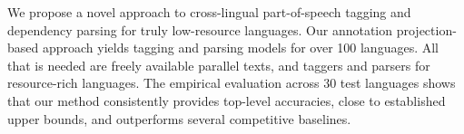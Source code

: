 We propose a novel approach to cross-lingual part-of-speech tagging and dependency parsing for truly low-resource languages. Our annotation projection-based approach yields tagging and parsing models for over 100 languages. All that is needed are freely available parallel texts, and taggers and parsers for resource-rich languages. The empirical evaluation across 30 test languages shows that our method consistently provides top-level accuracies, close to established upper bounds, and outperforms several competitive baselines.

